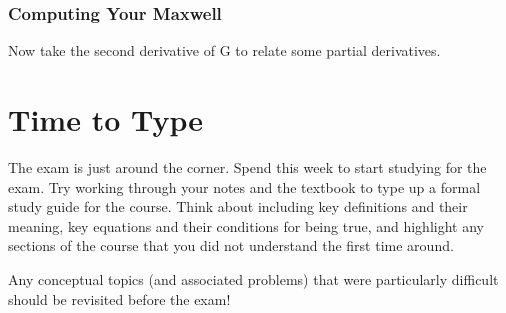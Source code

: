 \documentclass{article}
\begin{document}
\subsubsection{Computing Your Maxwell}
Now take the second derivative of G to relate some partial derivatives.

\section{Time to Type}
The exam is just around the corner. 
Spend this week to start studying for the exam. 
Try working through your notes and the textbook to type up a formal study guide for the course. 
Think about including key definitions and their meaning, key equations and their conditions for being true, and highlight any sections of the course that you did not understand the first time around. 

Any conceptual topics (and associated problems) that were particularly difficult should be revisited before the exam! 
\end{document}
